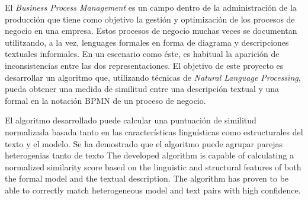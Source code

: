 El \emph{Business Process Management} es un campo dentro de la administración de la producción que tiene como objetivo la gestión y optimización de los procesos de negocio en una empresa. Estos procesos de negocio muchas veces se documentan utilitzando, a la vez, lenguages formales en forma de diagrama y descripciones textuales informales. En un escenario como éste, es habitual la aparición de inconsistencias entre las dos representaciones. El objetivo de este proyecto es desarrollar un algoritmo que, utilizando técnicas de \emph{Natural Language Processing}, pueda obtener una medida de similitud entre una descripción textual y una formal en la notación BPMN de un proceso de negocio.

El algoritmo desarrollado puede calcular una puntuación de similitud normalizada basada tanto en las características linguísticas como estructurales del texto y el modelo. Se ha demostrado que el algoritmo puede agrupar parejas heterogenias tanto de texto
The developed algorithm is capable of calculating a normalized similarity score based on the linguistic and structural features of both the formal model and the textual description. The algorithm has proven to be able to correctly match heterogeneous model and text pairs with high confidence.  

\clearpage
